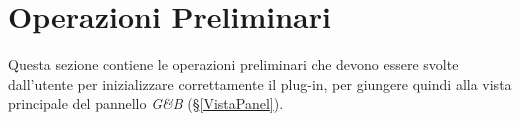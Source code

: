 \section{Operazioni Preliminari}
Questa sezione contiene le operazioni preliminari che devono essere svolte dall'utente per inizializzare correttamente il plug-in, per giungere quindi alla vista principale del pannello \textit{G\&B} (§\ref{VistaPanel}).



